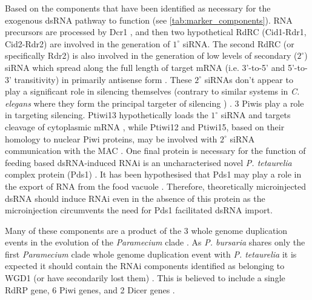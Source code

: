 Based on the components that have been identified as necessary
for the exogenous dsRNA pathway to function (see \cref{tab:marker_components}).  
RNA precursors are processed
by Dcr1 \citep{Lepere2009}, and then two hypothetical RdRC (Cid1-Rdr1, Cid2-Rdr2)
\citep{Marker2010,Marker2014} are involved in the generation of \(1^{\circ}\) 
siRNA.  
The second RdRC (or specifically Rdr2) is also involved in the generation
of low levels of secondary (\(2^{\circ}\)) siRNA which spread along the full length of
target mRNA (i.e. 3'-to-5' and 5'-to-3' transitivity) in primarily
antisense form \citep{Carradec2015}.  These \(2^{\circ}\) siRNAs don't
appear to play a significant role in silencing themselves (contrary to similar
systems in \textit{C. elegans} where they form the principal targeter of silencing 
\citep{Sijen2007,Pak2007}) \citep{Carradec2015}.
3 Piwis play a role in targeting silencing.  Ptiwi13 hypothetically
loads the \(1^{\circ}\) siRNA and targets cleavage of cytoplasmic mRNA \citep{Bouhouche2011},
while Ptiwi12 and Ptiwi15, based on their homology to nuclear Piwi proteins,
\citep{Marker2014,Carradec2015,Bouhouche2011} may be involved
with \(2^{\circ}\) siRNA communication with the MAC \citep{Carradec2015}.
One final protein is necessary for the function of feeding based dsRNA-induced
RNAi is an uncharacterised novel \textit{P. tetaurelia} complex protein (Pds1) \citep{Marker2014}.
It has been hypothesised that Pds1 may play a role in the export of RNA from 
the food vacuole \citep{Carradec2015}.  Therefore, theoretically
microinjected dsRNA should induce RNAi even in the absence of this protein
as the microinjection circumvents the need for Pds1 facilitated dsRNA import.


Many of these components are a product of the 3 whole genome duplication
events in the evolution of the \textit{Paramecium} clade \citep{McGrath2014}.
As \textit{P. bursaria} shares only the first \textit{Paramecium} clade whole
genome duplication event with \textit{P. tetaurelia} it is expected
it should contain the RNAi components identified as belonging to WGD1 (or have 
secondarily lost them) \citep{McGrath2014}.
This is believed to include a single RdRP gene, 6 Piwi genes, and 2 Dicer genes \citep{Marker2014}.



